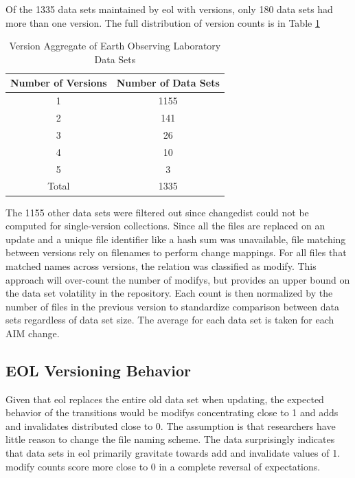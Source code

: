 Of the 1335 data sets maintained by \gls{eol} with \glspl{version}, only 180 data sets had more than one \gls{version}.  
The full distribution of version counts is in Table \ref{table:EOL_Versions}
\begin{table}
	\caption{Version Aggregate of Earth Observing Laboratory Data Sets}
	\label{table:EOL_Versions}
	\centering
	\begin{tabular}{|c|c|}
		\hline
		Number of Versions& Number of Data Sets\\ \hline
		1&	1155\\
		2&	141\\
		3&	26\\
		4&	10\\
		5&	3\\ \hline
		Total&	1335\\
		\hline
	\end{tabular}
\end{table}
The 1155 other data sets were filtered out since \gls{changedist} could not be computed for single-version collections.
Since all the files are replaced on an update and a unique file identifier like a hash sum was unavailable, file matching between versions rely on filenames to perform change mappings.
For all files that matched names across \glspl{version}, the relation was classified as \gls{modify}.  
This approach will over-count the number of \glspl{modify}, but provides an upper bound on the data set \gls{volatility} in the repository.  
Each count is then normalized by the number of files in the previous \gls{version} to standardize comparison between data sets regardless of data set size.  
The average for each data set is taken for each \gls{AIM} \gls{change}.

\subsection{EOL Versioning Behavior} \label{sec:behavior}

Given that \gls{eol} replaces the entire old data set when updating, the expected behavior of the transitions would be \glspl{modify} concentrating close to 1 and \glspl{add} and \glspl{invalidate} distributed close to 0.
The assumption is that researchers have little reason to change the file naming scheme.
The data surprisingly indicates that data sets in \gls{eol} primarily gravitate towards \gls{add} and \gls{invalidate} values of 1.
\gls{modify} counts score more close to 0 in a complete reversal of expectations.

